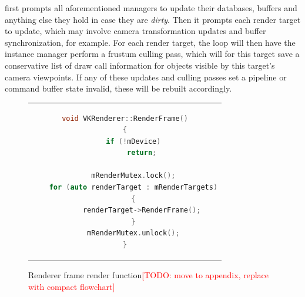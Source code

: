  first prompts all aforementioned managers to update their databases, buffers and anything else they hold in case they are \textit{dirty}. Then it prompts each render target to update, which may involve camera transformation updates and buffer synchronization, for example. For each render target, the loop will then have the instance manager perform a frustum culling pass, which will for this target save a conservative list of draw call information for objects visible by this target's camera viewpoints. 
If any of these updates and culling passes set a pipeline or command buffer state invalid, these will be rebuilt accordingly.  

\begin{figure}[htb]
  \centering
  \begin{tabular}{c}
  \begin{lstlisting}[language=C++]
void VKRenderer::RenderFrame()
{
	if (!mDevice)
		return;

	mRenderMutex.lock();
	for (auto renderTarget : mRenderTargets)
	{
		renderTarget->RenderFrame();
	}
	mRenderMutex.unlock();
}
	\end{lstlisting}
  \end{tabular}
  \caption[VKRenderer's RenderFrame]{Renderer frame render function\textcolor{red}{[TODO: move to appendix, replace with compact flowchart]}}\label{fig:lst_VKRenderer_RenderFrame}
\end{figure}

